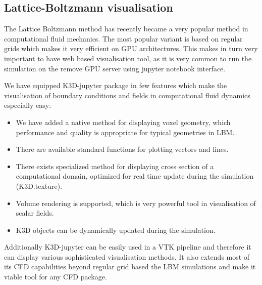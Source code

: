 \documentclass{deliverablereport}
\begin{document}
\subsection{Lattice-Boltzmann visualisation}

The Lattice Boltzmann method has recently became a very popular method
in computational fluid mechanics. The most popular variant is based on
regular grids which makes it very efficient on GPU architectures. This
makes in turn very important to have web based visualisation tool, as
it is very common to run the simulation on the remove GPU server using
jupyter notebook interface.

We have equipped K3D-jupyter package in few features which make the
visualisation of boundary conditions and fields in computational
fluid dynamics especially easy:

\begin{itemize}
\item We have added a native method for displaying voxel geometry,
  which performance and quality is appropriate for typical geometries
  in LBM.
\item There are available standard functions for plotting vectors and lines.
\item There exists specialized method for displaying cross section of
  a computational domain, optimized for real time update during the
  simulation (K3D.texture).
\item Volume rendering is supported, which is very powerful tool in
  visualisation of scalar fields.
\item K3D objects can be dynamically updated during the simulation.
\end{itemize}

Additionally K3D-jupyter can be easily used in a VTK pipeline and
therefore it can display various sophisticated visualisation
methods. It also extends most of its CFD capabilities beyond regular
grid based the LBM simulations and make it viable tool for any CFD
package.
\end{document}
